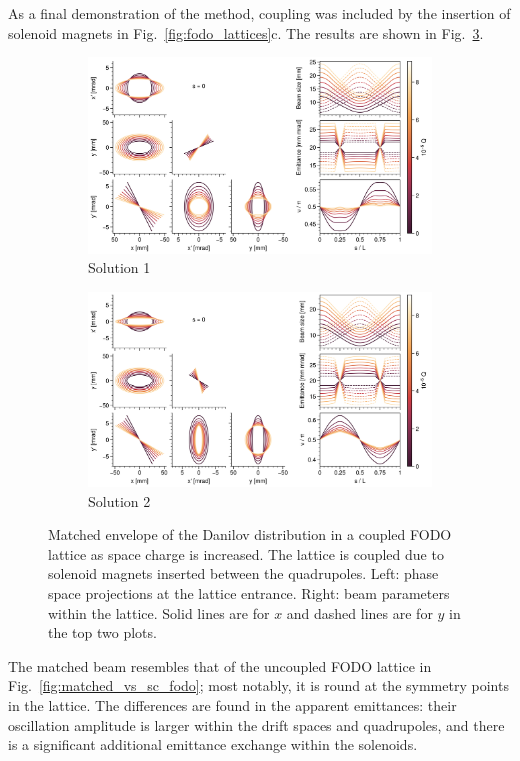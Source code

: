 As a final demonstration of the method, coupling was included by the insertion of solenoid magnets in Fig.~\ref{fig:fodo_lattices}c. The results are shown in Fig.~\ref{fig:matched_vs_sc_fodo_sol}.
%
\begin{figure}[!p]
    \begin{subfigure}{1.0\textwidth}
        \includegraphics[width=\textwidth]{Images/chapter2/matched_vs_sc_fodo_sol_mode1.png}
        \caption{Solution 1}
        \label{fig:matched_vs_sc_fodo_sol_a}
    \end{subfigure}
    \vfill
    \vfill
    \begin{subfigure}{1.0\textwidth}
        \centering
        \includegraphics[width=\textwidth]{Images/chapter2/matched_vs_sc_fodo_sol_mode2.png}
        \caption{Solution 2}
        \label{fig:matched_vs_sc_fodo_sol_b}
    \end{subfigure}
    \caption{Matched envelope of the Danilov distribution in a coupled FODO lattice as space  charge is increased. The lattice is coupled due to solenoid magnets inserted between the quadrupoles. Left: phase space projections at the lattice entrance. Right: beam parameters within the lattice. Solid lines are for $x$ and dashed lines are for $y$ in the top two plots.}
    \label{fig:matched_vs_sc_fodo_sol}
\end{figure}
%
The matched beam resembles that of the uncoupled FODO lattice in Fig.~\ref{fig:matched_vs_sc_fodo}; most notably, it is round at the symmetry points in the lattice. The differences are found in the apparent emittances: their oscillation amplitude is larger within the drift spaces and quadrupoles, and there is a significant additional emittance exchange within the solenoids. 


